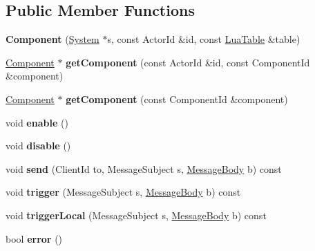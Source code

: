 \subsection*{Public Member Functions}
\begin{DoxyCompactItemize}
\item 
\mbox{\label{classTarbora_1_1Component_af131ce04afe7eadb2589afcec5fa52d8}} 
{\bfseries Component} (\hyperlink{classTarbora_1_1System}{System} $\ast$s, const Actor\+Id \&id, const \hyperlink{classTarbora_1_1LuaTable}{Lua\+Table} \&table)
\item 
\mbox{\label{classTarbora_1_1Component_a9b772f4d99f64b23685a58e7294ab981}} 
\hyperlink{classTarbora_1_1Component}{Component} $\ast$ {\bfseries get\+Component} (const Actor\+Id \&id, const Component\+Id \&component)
\item 
\mbox{\label{classTarbora_1_1Component_abeeb3dba77af922915cbe9bc7d29d646}} 
\hyperlink{classTarbora_1_1Component}{Component} $\ast$ {\bfseries get\+Component} (const Component\+Id \&component)
\item 
\mbox{\label{classTarbora_1_1Component_a856a0b9e17ccd0336f1a33cf2fd2ac20}} 
void {\bfseries enable} ()
\item 
\mbox{\label{classTarbora_1_1Component_a163aa5702b50ede0dddfe1f8620afca5}} 
void {\bfseries disable} ()
\item 
\mbox{\label{classTarbora_1_1Component_a227a558106b74d4b8b0be7667c7610c5}} 
void {\bfseries send} (Client\+Id to, Message\+Subject s, \hyperlink{classTarbora_1_1MessageBody}{Message\+Body} b) const
\item 
\mbox{\label{classTarbora_1_1Component_a47985733836fce6b3cc5e0f77607d4e8}} 
void {\bfseries trigger} (Message\+Subject s, \hyperlink{classTarbora_1_1MessageBody}{Message\+Body} b) const
\item 
\mbox{\label{classTarbora_1_1Component_aa3eddb1cf4ba3fb1f0652d0c3aee07b6}} 
void {\bfseries trigger\+Local} (Message\+Subject s, \hyperlink{classTarbora_1_1MessageBody}{Message\+Body} b) const
\item 
\mbox{\label{classTarbora_1_1Component_ad8232ed039bec74c81fc7589ee34cbf7}} 
bool {\bfseries error} ()
\end{DoxyCompactItemize}
